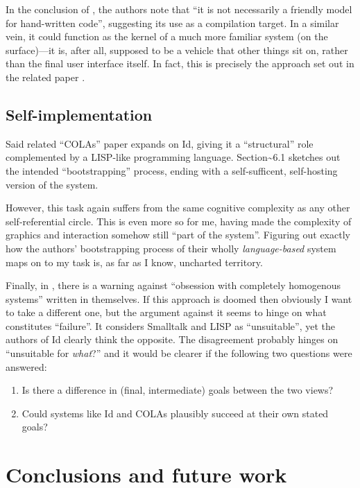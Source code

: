 In the conclusion of \cite{OROM}, the authors note that ``it is not
necessarily a friendly model for hand-written code'', suggesting its use
as a compilation target. In a similar vein, it could function as the
kernel of a much more familiar system (on the surface)---it is, after
all, supposed to be a vehicle that other things sit on, rather than the
final user interface itself. In fact, this is precisely the approach set
out in the related paper \cite{COLAs}.

\hypertarget{self-implementation}{%
\subsection{Self-implementation}\label{self-implementation}}

Said related ``COLAs'' paper expands on Id{}, giving it a ``structural''
role complemented by a LISP-like programming language.
Section\textasciitilde{}6.1 sketches out the intended ``bootstrapping''
process, ending with a self-sufficent, self-hosting version of the
system.

However, this task again suffers from the same cognitive complexity as
any other self-referential circle. This is even more so for me, having
made the complexity of graphics and interaction somehow still ``part of
the system''. Figuring out exactly how the authors' bootstrapping
process of their wholly \emph{language-based} system maps on to my task
is, as far as I know, uncharted territory.

Finally, in \cite{crit-semprola}, there is a warning against ``obsession
with completely homogenous systems'' written in themselves. If this
approach is doomed then obviously I want to take a different one, but
the argument against it seems to hinge on what constitutes ``failure''.
It considers Smalltalk and LISP as ``unsuitable'', yet the authors of
Id{} clearly think the opposite. The disagreement probably hinges on
``unsuitable for \emph{what}?'' and it would be clearer if the following
two questions were answered:

\begin{enumerate}
\def\labelenumi{\arabic{enumi}.}
\tightlist
\item
  Is there a difference in (final, intermediate) goals between the two
  views?
\item
  Could systems like Id{} and COLAs plausibly succeed at their own
  stated goals?
\end{enumerate}

\hypertarget{conclusions-and-future-work}{%
\section{Conclusions and future
work}\label{conclusions-and-future-work}}

